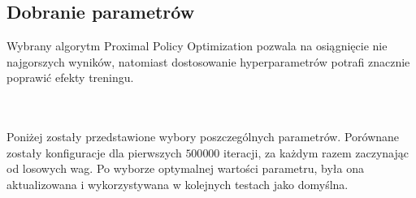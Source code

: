 \subsection{Dobranie parametrów}
Wybrany algorytm Proximal Policy Optimization pozwala na osiągnięcie nie najgorszych wyników, natomiast dostosowanie hyperparametrów potrafi znacznie poprawić efekty treningu.
\\\\
\phantom{.}\\
Poniżej zostały przedstawione wybory poszczególnych parametrów. Porównane zostały konfiguracje dla pierwszych $500 000$ iteracji, za każdym razem zaczynając od losowych wag. Po wyborze optymalnej wartości parametru, była ona aktualizowana i wykorzystywana w kolejnych testach jako domyślna.\\
\clearpage

